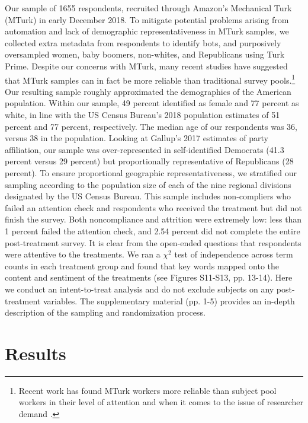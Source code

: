 Our sample of 1655 respondents, recruited through Amazon's Mechanical Turk (MTurk) in early December 2018. To mitigate potential problems arising from automation and lack of demographic representativeness in MTurk samples, we collected extra metadata from respondents to identify bots, and purposively oversampled women, baby boomers, non-whites, and Republicans using Turk Prime. Despite our concerns with MTurk, many recent studies have suggested that MTurk samples can in fact be more reliable than traditional survey pools.\footnote{Recent work has found MTurk workers more reliable than subject pool workers in their level of attention \citep{white_strezhnev_lucas_kruszewska_huff_2018} and when it comes to the issue of researcher demand \citep{Hauser2016}.}  Our resulting sample roughly approximated the demographics of the American population. Within our sample, 49 percent identified as female and 77 percent as white, in line with the US Census Bureau's 2018 population estimates of 51 percent and 77 percent, respectively. The median age of our respondents was 36, versus 38 in the population. Looking at Gallup's 2017 estimates of party affiliation, our sample was over-represented in self-identified Democrats (41.3 percent versus 29 percent) but proportionally representative of Republicans (28 percent). To ensure proportional geographic representativeness, we stratified our sampling according to the population size of each of the nine regional divisions designated by the US Census Bureau. This sample includes non-compliers who failed an attention check and respondents who received the treatment but did not finish the survey. Both noncompliance and attrition were extremely low: less than 1 percent failed the attention check, and 2.54 percent did not complete the entire post-treatment survey. It is clear from the open-ended questions that respondents were attentive to the treatments. We ran a $\chi^2$ test of independence across term counts in each treatment group and found that key words mapped onto the content and sentiment of the treatments (see Figures S11-S13, pp. 13-14). Here we conduct an intent-to-treat analysis and do not exclude subjects on any post-treatment variables. The supplementary material (pp. 1-5) provides an in-depth description of the sampling and randomization process.

\section{Results}
	
